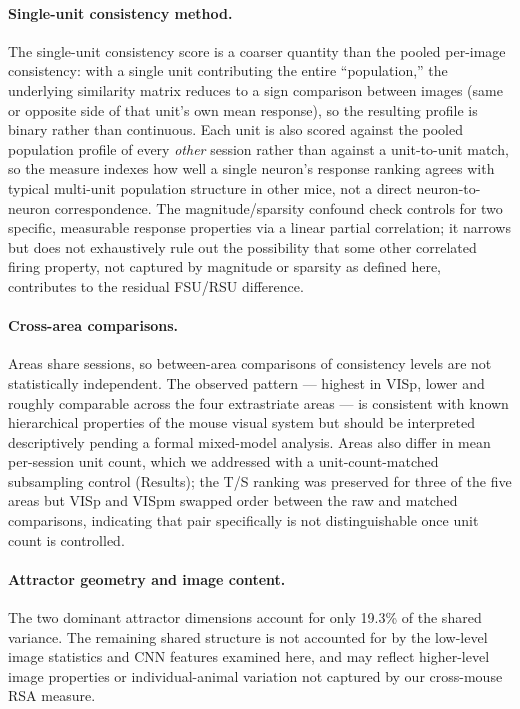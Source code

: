 \documentclass[11pt,onecolumn]{article}
\begin{document}
\paragraph{Single-unit consistency method.}
The single-unit consistency score is a coarser quantity than the pooled
per-image consistency: with a single unit contributing the entire
``population,'' the underlying similarity matrix reduces to a sign
comparison between images (same or opposite side of that unit's own
mean response), so the resulting profile is binary rather than
continuous.  Each unit is also scored against the pooled population
profile of every \textit{other} session rather than against a
unit-to-unit match, so the measure indexes how well a single neuron's
response ranking agrees with typical multi-unit population structure in
other mice, not a direct neuron-to-neuron correspondence.  The
magnitude/sparsity confound check controls for two specific, measurable
response properties via a linear partial correlation; it narrows but does
not exhaustively rule out the possibility that some other correlated
firing property, not captured by magnitude or sparsity as defined here,
contributes to the residual FSU/RSU difference.

\paragraph{Cross-area comparisons.}
Areas share sessions, so between-area comparisons of consistency levels
are not statistically independent.  The observed pattern --- highest in
VISp, lower and roughly comparable across the four extrastriate areas
--- is consistent with known hierarchical properties of the mouse visual
system but should be interpreted descriptively pending a formal
mixed-model analysis.  Areas also differ in mean per-session unit count,
which we addressed with a unit-count-matched subsampling control
(Results); the T/S ranking was preserved for three of the five areas but
VISp and VISpm swapped order between the raw and matched comparisons,
indicating that pair specifically is not distinguishable once unit count
is controlled.

\paragraph{Attractor geometry and image content.}
The two dominant attractor dimensions account for only 19.3\% of the
shared variance.  The remaining shared structure is not accounted for by
the low-level image statistics and CNN features examined here, and may
reflect higher-level image properties or individual-animal variation not
captured by our cross-mouse RSA measure.
\end{document}
